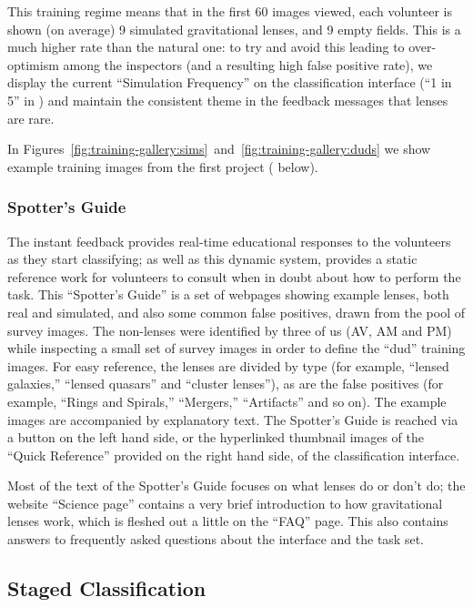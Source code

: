 \documentclass[useAMS,usenatbib,a4paper]{mn2e}
\begin{document}
This training regime means that in the first 60 images viewed, each volunteer
is shown (on average) 9 simulated gravitational lenses, and 9 empty fields.
This is a much higher rate than the natural one: to try and avoid this leading
to over-optimism among the inspectors (and a resulting high false positive
rate), we display the current ``Simulation Frequency'' on the classification
interface (``1 in 5'' in ) and maintain the consistent
theme in the feedback messages that lenses are rare.

In Figures~\ref{fig:training-gallery:sims}~and~\ref{fig:training-gallery:duds}
we show example training images from the first \SW project (
below).


\subsubsection{Spotter's Guide}

The instant feedback provides real-time educational responses to the
volunteers as they start classifying; as well as this dynamic system, \SW
provides a static reference work for volunteers to consult when in doubt about
how to perform the task. This ``Spotter's Guide'' is a set of webpages showing
example lenses, both real and simulated, and also some common false positives,
drawn from the pool of survey images. The non-lenses were identified by three
of us (AV, AM and PM) while inspecting a small set of survey images in order
to define the ``dud'' training images. For easy reference, the lenses are
divided by type (for example, ``lensed galaxies,'' ``lensed quasars'' and
``cluster lenses''), as are the false positives (for example, ``Rings and
Spirals,'' ``Mergers,'' ``Artifacts'' and so on). The example images are
accompanied by explanatory text. The Spotter's Guide is reached via a button
on the left hand side, or the hyperlinked thumbnail images of the ``Quick
Reference'' provided on the right hand side, of the classification interface.

Most of the text of the Spotter's Guide focuses on what lenses do or don't do;
the website ``Science page'' contains a very brief introduction to how
gravitational lenses work, which is fleshed out a little on the ``FAQ'' page.
This also contains answers to frequently asked questions about the interface
and the task set.


\subsection{Staged Classification}
\label{sec:design:stages}
\end{document}
